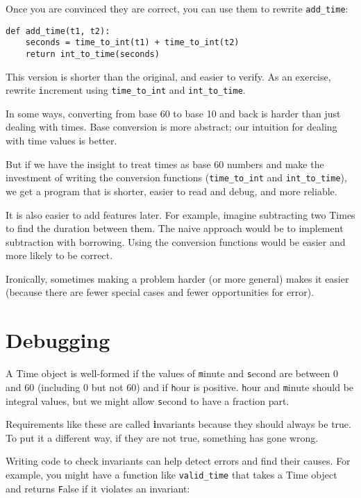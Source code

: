 \documentclass[
DIV=11,
fontsize=13,
twoside,
headinclude=false,
titlepage=firstiscover,
abstract=true,
headsepline=true,
footsepline=true,
chapterprefix=true, %
headings=big,
bibliography=totoc,%
captions=tableheading
]{scrbook}
\theoremstyle{definition}
\begin{document}
Once you are convinced they are correct, you can use them to 
rewrite \verb"add_time":

\begin{lstlisting}
def add_time(t1, t2):
    seconds = time_to_int(t1) + time_to_int(t2)
    return int_to_time(seconds)
\end{lstlisting}
%
This version is shorter than the original, and easier to verify.  As
an exercise, rewrite {\texttt increment} using \verb"time_to_int" and
\verb"int_to_time".

In some ways, converting from base 60 to base 10 and back is harder
than just dealing with times.  Base conversion is more abstract; our
intuition for dealing with time values is better.

But if we have the insight to treat times as base 60 numbers and make
the investment of writing the conversion functions (\verb"time_to_int"
and \verb"int_to_time"), we get a program that is shorter, easier to
read and debug, and more reliable.

It is also easier to add features later.  For example, imagine
subtracting two Times to find the duration between them.  The
naive approach would be to implement subtraction with borrowing.
Using the conversion functions would be easier and more likely to be
correct.

Ironically, sometimes making a problem harder (or more general) makes it
easier (because there are fewer special cases and fewer opportunities
for error).


\section{Debugging}

A Time object is well-formed if the values of {\texttt minute} and {\texttt
second} are between 0 and 60 (including 0 but not 60) and if 
{\texttt hour} is positive.  {\texttt hour} and {\texttt minute} should be
integral values, but we might allow {\texttt second} to have a
fraction part.

Requirements like these are called {\textbf invariants} because
they should always be true.  To put it a different way, if they
are not true, something has gone wrong.

Writing code to check invariants can help detect errors
and find their causes.  For example, you might have a function
like \verb"valid_time" that takes a Time object and returns
{\texttt False} if it violates an invariant:
\end{document}
